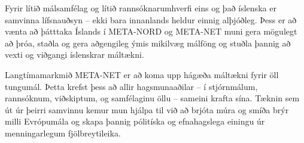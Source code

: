 \begin{multicols}{2}
Fyrir lítið málsamfélag og lítið rannsóknarumhverfi eins og það íslenska er samvinna lífsnauðsyn -- ekki bara innanlands heldur einnig alþjóðleg. Þess er að vænta að þátttaka Íslands í META-NORD og META-NET muni gera mögulegt að þróa, staðla og gera aðgengileg ýmis mikilvæg málföng og stuðla þannig að vexti og viðgangi íslenskrar máltækni. 

Langtímamarkmið META-NET er að koma upp hágæða máltækni fyrir öll tungumál. Þetta krefst þess að allir hagsmunaaðilar -- í stjórnmálum, rannsóknum, viðskiptum, og samfélaginu öllu -- sameini krafta sína. Tæknin sem út úr þeirri samvinnu kemur mun hjálpa til við að brjóta múra og smíða brýr milli Evrópumála og skapa þannig pólitíska og efnahagslega einingu úr menningarlegum fjölbreytileika.
\end{multicols}

\clearpage

